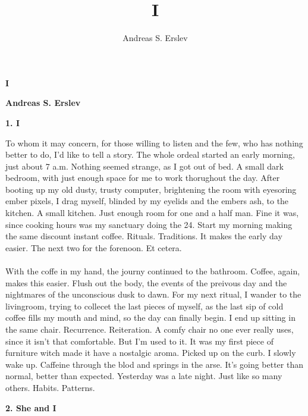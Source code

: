 \documentclass[]{article}
\title{I}
\author{Andreas S. Erslev}
\begin{document}
\begin{center}
	\Large\textbf{I}
\end{center}
\begin{center}
	\large\textbf{Andreas S. Erslev}
\end{center}

\begin{center}
	\large\textbf{1. I}
\end{center}

To whom it may concern, for those willing to listen and the few, who has nothing better to do, I'd like to tell a story. The whole ordeal started an early morning, just about 7 a.m. Nothing seemed strange, as I got out of bed. A small dark bedroom, with just enough space for me to work thorughout the day. After booting up my old dusty, trusty computer, brightening the room with eyesoring ember pixels, I drag myself, blinded by my eyelids and the embers ash, to the kitchen. A small kitchen. Just enough room for one and a half man. Fine it was, since cooking hours was my sanctuary doing the 24. Start my morning making the same discount instant coffee. Rituals. Traditions. It makes the early day easier. The next two for the forenoon. Et cetera. 
\\ \\ 
With the coffe in my hand, the journy continued to the bathroom. Coffee, again, makes this easier. Flush out the body, the events of the preivous day and the nightmares of the unconscious dusk to dawn. For my next ritual, I wander to the livingroom, trying to collecet the last pieces of myself, as the last sip of cold coffee fills my mouth and mind, so the day can finally begin. I end up sitting in the same chair. Recurrence. Reiteration. A comfy chair no one ever really uses, since it isn't that comfortable. But I'm used to it. It was my first piece of furniture witch made it have a nostalgic aroma. Picked up on the curb. I slowly wake up. Caffeine through the blod and springs in the arse. It's going better than normal, better than expected. Yesterday was a late night. Just like so many others. Habits. Patterns.

\newpage

\begin{center}
	\large\textbf{2. She and I}
\end{center}
\end{document}
